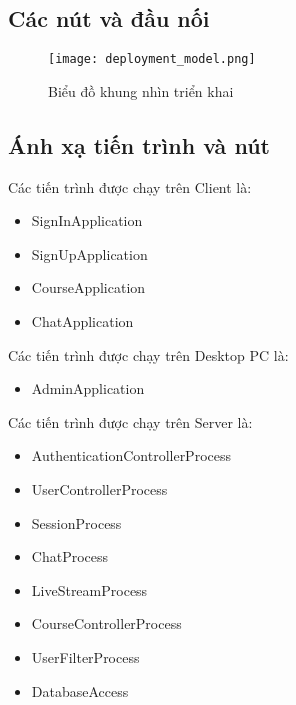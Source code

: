 \documentclass[./../main_file.tex]{subfiles}
\begin{document}
\subsection{Các nút và đầu nối}
\begin{figure}[H]
	\centering
\texttt{[image: deployment\_model.png]}
	\caption{Biểu đồ khung nhìn triển khai}
\end{figure}
\subsection{Ánh xạ tiến trình và nút}

Các tiến trình được chạy trên Client là:
\begin{itemize}[leftmargin=+0.5in]
	\item SignInApplication
	\item SignUpApplication
	\item CourseApplication
	\item ChatApplication
\end{itemize}


Các tiến trình được chạy trên Desktop PC là:
\begin{itemize}[leftmargin=+0.5in]
	\item AdminApplication
\end{itemize}


Các tiến trình được chạy trên Server là:
\begin{itemize}[leftmargin=+0.5in]
\item AuthenticationControllerProcess
	\item UserControllerProcess
	\item SessionProcess
	\item ChatProcess
	\item LiveStreamProcess
	\item CourseControllerProcess
	\item UserFilterProcess
	\item DatabaseAccess
\end{itemize}
\end{document}

